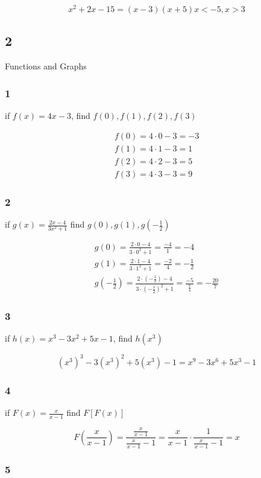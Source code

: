 \documentclass[]{report}
\begin{document}
\[
x^2 + 2x - 15  = (x - 3)(x + 5)
x < -5, x > 3
\]

\subsection{2} Functions and Graphs

\subsubsection{1}
if $f(x) = 4x-3$, find $f(0), f(1), f(2), f(3)$

\begin{align*}
f(0) = 4\cdot0 - 3 = -3\\
f(1) = 4\cdot1 - 3 = 1 \\
f(2) = 4\cdot2 - 3 = 5 \\
f(3) = 4\cdot3 - 3 = 9
\end{align*}

\subsubsection{2}
if $g(x) = \frac{2x-4}{3x^2 + 1}$ find $g(0), g(1), g(-\frac{1}{2})$


\begin{align*}
g(0) = \frac{2\cdot0-4}{3\cdot0^2 + 1} = \frac{-4}{1} = -4\\
g(1) = \frac{2\cdot1 - 4}{3\cdot1^2 + 1} = \frac{-2}{4} = -\frac{1}{2}\\
g(-\frac{1}{2}) = \frac{2\cdot(-\frac{1}{2}) - 4}{3\cdot(-\frac{1}{2})^2 + 1} = \frac{-5}{\frac{7}{4}} = -\frac{20}{7}
\end{align*}


\subsubsection{3}
if $h(x) = x^3 - 3x^2 + 5x - 1$, find $h(x^3)$

\[
(x^3)^3 - 3(x^3)^2 + 5(x^3) - 1 = x^9 - 3x^6 + 5x^3 - 1
\]

\subsubsection{4}

if $F(x) = \frac{x}{x-1}$ find $F[F(x)]$


\[
F(\frac{x}{x-1}) = \frac{\frac{x}{x-1}}{\frac{x}{x-1}-1} = \frac{x}{x-1} \cdot \frac{1}{\frac{x}{x-1}-1} =  x
\]

\subsubsection{5}
\end{document}
